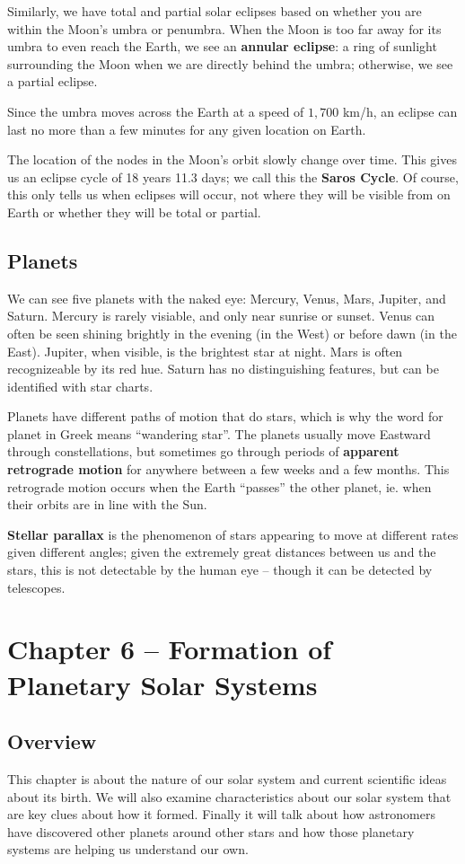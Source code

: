 \documentclass[12pt]{article}
\begin{document}
Similarly, we have total and partial solar eclipses based on whether you are within the Moon's umbra or penumbra. When the Moon is too far away for its umbra to even reach the Earth, we see an {\bf annular eclipse}: a ring of sunlight surrounding the Moon when we are directly behind the umbra; otherwise, we see a partial eclipse.

Since the umbra moves across the Earth at a speed of $1,700$ km/h, an eclipse can last no more than a few minutes for any given location on Earth.

The location of the nodes in the Moon's orbit slowly change over time. This gives us an eclipse cycle of 18 years 11.3 days; we call this the {\bf Saros Cycle}. Of course, this only tells us when eclipses will occur, not where they will be visible from on Earth or whether they will be total or partial.

\subsection{Planets}
We can see five planets with the naked eye: Mercury, Venus, Mars, Jupiter, and Saturn. Mercury is rarely visiable, and only near sunrise or sunset. Venus can often be seen shining brightly in the evening (in the West) or before dawn (in the East). Jupiter, when visible, is the brightest star at night. Mars is often recognizeable by its red hue. Saturn has no distinguishing features, but can be identified with star charts.

Planets have different paths of motion that do stars, which is why the word for planet in Greek means ``wandering star''. The planets usually move Eastward through constellations, but sometimes go through periods of {\bf apparent retrograde motion} for anywhere between a few weeks and a few months. This retrograde motion occurs when the Earth ``passes'' the other planet, ie. when their orbits are in line with the Sun.

{\bf Stellar parallax} is the phenomenon of stars appearing to move at different rates given different angles; given the extremely great distances between us and the stars, this is not detectable by the human eye -- though it can be detected by telescopes.

\section{Chapter 6 -- Formation of Planetary Solar Systems}
\subsection{Overview}
This chapter is about the nature of our solar system and current scientific ideas about its birth. We will also examine characteristics about our solar system that are key clues about how it formed. Finally it will talk about how astronomers have discovered other planets around other stars and how those planetary systems are helping us understand our own.
\end{document}

